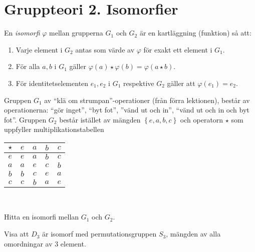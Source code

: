 \documentclass[11pt,fleqn]{book} %
\begin{document}
  \renewcommand*\rmdefault{ppl}\normalfont\upshape

\chapter{Gruppteori 2. Isomorfier}
\large
\thispagestyle{empty}

\begin{definition} En \textit{isomorfi} \(\varphi \) mellan grupperna \(G_1\) och \(G_2\) är en kartläggning (funktion) så att:
  \begin{enumerate} %
    \item Varje element i \(G_2\) antas som värde av \(\varphi\) för exakt ett element i \(G_1\).
    \item För alla \(a, b\) i \(G_1\) gäller \(\varphi(a) \star \varphi (b) = \varphi(a  \star b)\).
    \item För identitetselementen \(e_1, e_2\) i \(G_1\) respektive \(G_2\) gäller att \(\varphi(e_1) = e_2\).
  \end{enumerate}
\end{definition}

\begin{problem}
  Gruppen \(G_1\) av ``klä om strumpan''-operationer (från förra lektionen), består av operationerna: ``gör inget'', ``byt fot'', ''vänd ut och in'', ``vänd ut och in och byt fot''. Gruppen \(G_2\) består istället av mängden \(\left\{e, a, b, c\right\}\) och operatorn \(\star\) som uppfyller multiplikationstabellen 
  { \center
  \begin{tabular}{c|cccc}
    \( \star \) & \(e\) & \(a\) & \(b\) & \(c\)  \\ \midrule
    \(e\) & \(e\) & \(a\) & \(b\) & \(c\)  \\
    \(a\) & \(a\) & \(e\) & \(c\) & \(b\) \\
    \(b\) & \(b\) & \(c\) & \(e\) & \(a\) \\
    \(c\) & \(c\) & \(b\) & \(a\) & \(e\) \\
  \end{tabular}\\}
  \vspace{2ex}
  \noindent Hitta en isomorfi mellan \(G_1\) och \(G_2\).
\end{problem}

\begin{problem}
  Visa att \(D_3\) är isomorf med permutationsgruppen \(S_3\), mängden av alla omordningar av 3 element.
\end{problem}
\end{document}
